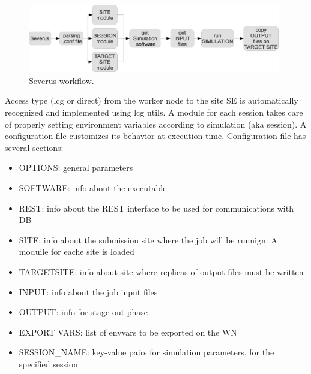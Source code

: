 \documentclass[a4paper]{jpconf}
\begin{document}
\begin{figure}[h]
\includegraphics[width=26pc]{img/severus_workflow.eps}\hspace{2pc}%
\caption{\label{fig:severus_workflow}Severus workflow.}
\end{figure}

Access type (lcg or direct) from the worker node to the site SE is automatically recognized and implemented using lcg utils.
A module for each session takes care of properly setting environment variables according to simulation (aka session).
A configuration file customizes its behavior at execution time.
Configuration file has several sections:
\begin{itemize}
\item OPTIONS: general parameters
\item SOFTWARE: info about the executable
\item REST: info about the REST interface to be used for communications with DB
\item SITE: info about the submission site where the job will be runnign. A moduile for eache site is loaded
\item TARGETSITE:  info about site where replicas of output files must be written
\item INPUT: info about the job input files
\item OUTPUT: info for stage-out phase
\item EXPORT VARS: list of envvars to be exported on the WN
\item SESSION\_NAME: key-value pairs for simulation parameters, for the specified session
\end{itemize}
 
\end{document}
